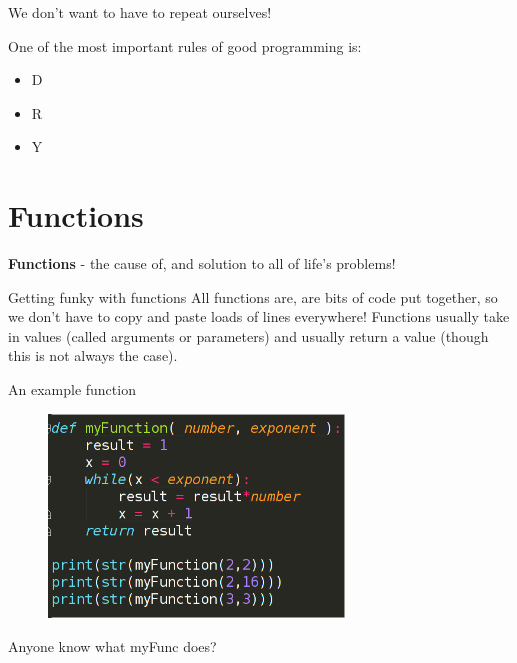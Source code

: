 \documentclass{beamer}
\begin{document}
\begin{frame}{We don't want to have to repeat ourselves!}

One of the most important rules of good programming is:

\pause

\begin{itemize}

\item[] D 
\item[] R 
\item[] Y 

\end{itemize}
\end{frame}

\section{Functions}

\begin{frame}
\pause
\textbf{Functions} \pause  - the cause of, and solution to all of life's problems!
\end{frame}

\begin{frame}{Getting funky with functions}
\pause
All functions are, are bits of code put together, so we don't have to copy and paste loads of lines everywhere!
\pause
Functions usually take in values (called arguments or parameters) and usually return a value (though this is not always the case).
\end{frame}

\begin{frame}{An example function}

\begin{figure}[h]
\includegraphics[width=0.7\textwidth]{myfunc}
\end{figure}
\pause
Anyone know what myFunc does?

\end{frame}
\end{document}
